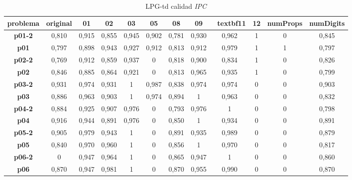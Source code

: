 \documentclass{article}
\begin{document}
    \begin{landscape}
    \begin{table}[]
    \centering
    \caption{LPG-td calidad \textit{IPC}}
    \label{LPG-costs}
    \begin{tabular}{|c|c|c|c|c|c|c|c|c|c|c|c|}
    \hline
    \textbf{problema} & \textbf{original} & \textbf{01}    & \textbf{02}    & \textbf{03}    & \textbf{05}    & \textbf{08}    & \textbf{09}    & \ textbf{11}    & \textbf{12}    & \textbf{numProps} & \textbf{numDigits} \\ \hline
    \textbf{p01-2}  &  0,810  &  0,915  &  0,855  &  0,945  &  0,902  &  0,781  &  0,930  &  0,962  &  1      &  0      &  0,845 \\ \hline
    \textbf{p01}    &  0,797  &  0,898  &  0,943  &  0,927  &  0,912  &  0,813  &  0,912  &  0,979  &  1      &  1      &  0,797 \\ \hline
    \textbf{p02-2}  &  0,769  &  0,912  &  0,859  &  0,937  &  0      &  0,818  &  0,900  &  0,834  &  1      &  0      &  0,826 \\ \hline
    \textbf{p02}    &  0,846  &  0,885  &  0,864  &  0,921  &  0      &  0,813  &  0,965  &  0,935  &  1      &  0      &  0,799 \\ \hline
    \textbf{p03-2}  &  0,931  &  0,974  &  0,931  &  1      &  0,987  &  0,838  &  0,974  &  0,974  &  0      &  0      &  0,903 \\ \hline
    \textbf{p03}    &  0,886  &  0,963  &  0,903  &  1      &  0,974  &  0,894  &  1      &  0,963  &  0      &  0      &  0,832 \\ \hline
    \textbf{p04-2}  &  0,884  &  0,925  &  0,907  &  0,976  &  0      &  0,793  &  0,976  &  1      &  0      &  0      &  0,798 \\ \hline
    \textbf{p04}    &  0,916  &  0,944  &  0,891  &  0,976  &  0      &  0,850  &  1      &  0,934  &  0      &  0      &  0,891 \\ \hline
    \textbf{p05-2}  &  0,905  &  0,979  &  0,943  &  1      &  0      &  0,891  &  0,935  &  0,989  &  0      &  0      &  0,879 \\ \hline
    \textbf{p05}    &  0,840  &  0,970  &  0,960  &  1      &  0      &  0,856  &  1      &  0,970  &  0      &  0      &  0,817 \\ \hline
    \textbf{p06-2}  &  0      &  0,947  &  0,964  &  1      &  0      &  0,865  &  0,947  &  1      &  0      &  0      &  0,860 \\ \hline
    \textbf{p06}    &  0,870  &  0,947  &  0,981  &  1      &  0      &  0,870  &  0,955  &  0,990  &  0      &  0      &  0,870 \\ \hline

\end{tabular}
\end{table}
\end{landscape}
\end{document}

